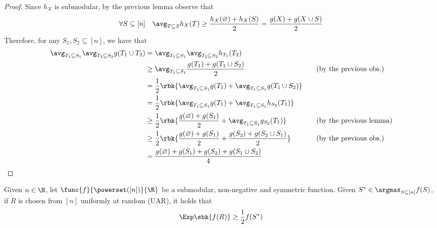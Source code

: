 \documentclass[a4paper, 12pt]{report}
\begin{document}
\begin{proof}
        Since $h_X$ is submodular, by the previous lemma observe that $$\forall S \subseteq [n] \quad \avg_{T \subseteq S}{h_X(T)} \ge \dfrac{h_X(\varnothing) + h_X(S)}{2} = \dfrac{g(X) + g(X \cup S)}{2}$$ Therefore, for any $S_1, S_2 \subseteq [n]$, we have that
        \begin{equation*}
            \begin{alignedat}{2}
                \avg_{T_1 \subseteq S_1}{\avg_{T_2 \subseteq S_2}{g(T_1 \cup T_2)}} &= \avg_{T_1 \subseteq S_1}{\avg_{T_2 \subseteq S_2}{h_{T_1}(T_2)}} && \\
                                                                                    &\ge \avg_{T_1 \subseteq S_1}{\dfrac{g(T_1) + g(T_1 \cup S_2)}{2}} && \quad \quad (\mathrm{by \ the \ previous \ obs.})\\
                                                                                    &= \dfrac{1}{2}\rbk{\avg_{T_1 \subseteq S_1}{g(T_1)} + \avg_{T_1 \subseteq S_1}{g(T_1 \cup S_2)}} && \\
                                                                                    &= \dfrac{1}{2} \rbk{\avg_{T_1 \subseteq S_1}{g(T_1)} + \avg_{T_1 \subseteq S_1}{h_{S_2}(T_1)}} && \\
                                                                                    &\ge \dfrac{1}{2} \rbk{\dfrac{g(\varnothing) + g(S_1)}{2} + \avg_{T_1 \subseteq S_1}{g_{S_2}(T_1)}} && \quad \quad (\mathrm{by \ the \ previous \ lemma}) \\
                                                                                    &\ge \dfrac{1}{2} \rbk{\dfrac{g(\varnothing) + g(S_1)}{2} + \dfrac{g(S_2) + g(S_2 \cup S_1)}{2}} && \quad \quad (\mathrm{by \ the \ previous \ obs.}) \\
                                                                                    &= \dfrac{g(\varnothing) + g(S_1) + g(S_2) + g(S_1 \cup S_2)}{4} && \\
            \end{alignedat}
        \end{equation*}
    \end{proof}

    \begin{framedthm}{}
        Given $n \in \N$, let $\func{f}{\powerset([n])}{\R}$ be a submodular, non-negative and symmetric function. Given $\displaystyle S^* \in \argmax_{S \subseteq [n]}{f(S)}$, if $R$ is chosen from $[n]$ uniformly at random (UAR), it holds that $$\Exp \sbk{f(R)} \ge \dfrac{1}{2}f(S^*)$$
    \end{framedthm}
    
\end{document}
